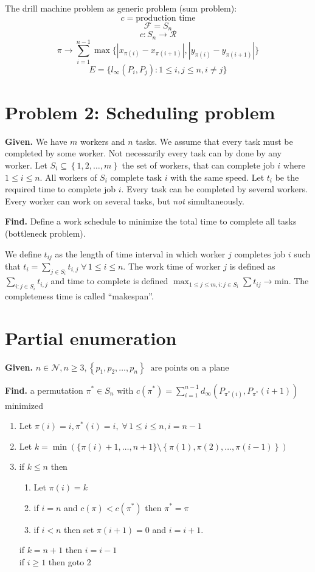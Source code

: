 \documentclass{article}
\newcommand{\set}[1]{\left\{#1\right\}}
\newcommand{\given}[1]{\textbf{Given.} #1\par}
\newcommand{\find}[1]{\textbf{Find.} #1\par}
\newcommand{\fall}{\;\forall\,}
\begin{document}
The drill machine problem as generic problem (sum problem):
\[
    c = \text{production time}
\] \[
    \mathcal{F} = S_n
\] \[
    c: S_n \rightarrow \mathcal{R}
\] \[
    \pi \rightarrow \sum_{i=1}^{n-1} \max\{|x_{\pi(i)} - x_{\pi(i+1)}|, |y_{\pi(i)} - y_{\pi(i+1)}|\}
\] \[
    E = \{l_\infty(P_i, P_j): 1 \leq i, j \leq n, i \neq j\}
\]

\section{Problem 2: Scheduling problem}
%
\given{We have $m$ workers and $n$ tasks. We assume that every task must be completed by some worker. Not necessarily every task can by done by any worker. Let $S_i \subseteq \set{1, 2, \ldots, m}$ the set of workers, that can complete job $i$ where $1 \leq i \leq n$. All workers of $S_i$ complete task $i$ with the same speed. Let $t_i$ be the required time to complete job $i$. Every task can be completed by several workers. Every worker can work on several tasks, but \emph{not} simultaneously.}
\find{Define a work schedule to minimize the total time to complete all tasks (bottleneck problem).}

We define $t_{ij}$ as the length of time interval in which worker $j$ completes job $i$ such that $t_i = \sum_{j \in S_i} t_{i,j} \fall 1 \leq i \leq n$. The work time of worker $j$ is defined as $\sum_{i: j \in S_i} t_{i,j}$ and time to complete is defined $\max_{1 \leq j \leq m, i: j \in S_i} \sum t_{ij} \rightarrow \text{min}$. The completeness time is called ``makespan''.

\section{Partial enumeration}
%
\given{$n \in \mathcal{N}, n \geq 3, \set{p_1, p_2, \ldots, p_n}\ \text{ are points on a plane}$}
\find{a permutation $\pi^* \in S_n$ with $c(\pi^*) = \sum_{i=1}^{n-1} d_\infty(P_{\pi^*(i)}, P_{\pi^*}(i+1))$ minimized}

\begin{enumerate}
  \item Let $\pi(i) = i, \pi^*(i) = i, \fall 1 \leq i \leq n, i = n - 1$
  \item Let $k = \min(\{\pi(i) + 1, \ldots, n+1\} \setminus \set{\pi(1), \pi(2), \ldots, \pi(i-1)})$
  \item if $k \leq n$ then
    \begin{enumerate}
      \item Let $\pi(i) = k$
      \item if $i = n$ and $c(\pi) < c(\pi^*)$ then $\pi^* = \pi$
      \item if $i < n$ then set $\pi(i+1) = 0$ and $i = i + 1$.
    \end{enumerate}
    if $k = n + 1$ then $i = i - 1$ \\
    if $i \geq 1$ then goto 2
\end{enumerate}
\end{document}
